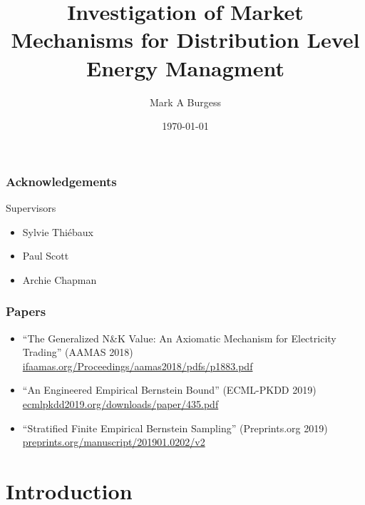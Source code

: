\documentclass{beamer}
\title[An investigation of Market Mechanisms]{Investigation of Market Mechanisms for Distribution Level Energy Managment} %
\author{Mark A Burgess} %
\institute[ANU] %
{
Australian National University \\ %
\medskip
\textit{mark.burgess@anu.edu.au} %
}
\date{\today} %
\begin{document}
\begin{frame}
\titlepage %
\end{frame}


\begin{frame}
\frametitle{Acknowledgements}
Supervisors
\begin{itemize}
\item	Sylvie Thi\'{e}baux
\item	Paul Scott
\item	Archie Chapman
\end{itemize}
\end{frame}

\begin{frame}
\frametitle{Papers}
\begin{itemize}
\item	``The Generalized N\&K Value: An Axiomatic Mechanism for Electricity Trading'' (AAMAS 2018)\\ \href{ifaamas.org/Proceedings/aamas2018/pdfs/p1883.pdf}{ifaamas.org/Proceedings/aamas2018/pdfs/p1883.pdf}
\item	``An Engineered Empirical Bernstein Bound'' (ECML-PKDD 2019)\\ \href{http://ecmlpkdd2019.org/downloads/paper/435.pdf}{ecmlpkdd2019.org/downloads/paper/435.pdf}
\item	``Stratified Finite Empirical Bernstein Sampling'' (Preprints.org 2019)\\ \href{preprints.org/manuscript/201901.0202/v2}{preprints.org/manuscript/201901.0202/v2}
\end{itemize}
\end{frame}


\section{Introduction}
\end{document}
